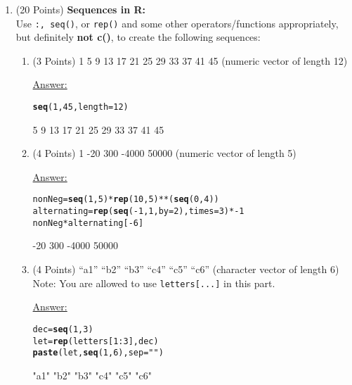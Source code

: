 \documentclass[12pt,letterpaper,final]{article}\usepackage[]{graphicx}\usepackage[]{xcolor}
\makeatletter
\newcommand{\hlnum}[1]{\textcolor[rgb]{0.686,0.059,0.569}{#1}}%
\newcommand{\hlstr}[1]{\textcolor[rgb]{0.192,0.494,0.8}{#1}}%
\newcommand{\hlopt}[1]{\textcolor[rgb]{0,0,0}{#1}}%
\newcommand{\hlstd}[1]{\textcolor[rgb]{0.345,0.345,0.345}{#1}}%
\newcommand{\hlkwb}[1]{\textcolor[rgb]{0.69,0.353,0.396}{#1}}%
\newcommand{\hlkwc}[1]{\textcolor[rgb]{0.333,0.667,0.333}{#1}}%
\newcommand{\hlkwd}[1]{\textcolor[rgb]{0.737,0.353,0.396}{\textbf{#1}}}%
\newenvironment{kframe}{%
 \def\at@end@of@kframe{}%
 \ifinner\ifhmode%
  \def\at@end@of@kframe{\end{minipage}}%
  \begin{minipage}{\columnwidth}%
 \fi\fi%
 \def\FrameCommand##1{\hskip\@totalleftmargin \hskip-\fboxsep
 \colorbox{shadecolor}{##1}\hskip-\fboxsep
     \hskip-\linewidth \hskip-\@totalleftmargin \hskip\columnwidth}%
 \MakeFramed {\advance\hsize-\width
   \@totalleftmargin\z@ \linewidth\hsize
   \@setminipage}}%
 {\par\unskip\endMakeFramed%
 \at@end@of@kframe}
\makeatother
\begin{document}
\begin{enumerate}

\item (20 Points) {\bf Sequences in R:} \\
Use {\tt :, seq()}, or {\tt rep()} and some other operators/functions appropriately, 
but definitely {\bf not c()}, to create the following sequences:

\begin{enumerate}
\item (3 Points)
1  5  9 13 17 21 25 29 33 37 41 45 (numeric vector of length 12)

\underline{Answer:}
\begin{kframe}
\begin{alltt}
\hlkwd{seq}\hlstd{(}\hlnum{1}\hlstd{,}\hlnum{45}\hlstd{,}\hlkwc{length}\hlstd{=}\hlnum{12}\hlstd{)}
\end{alltt}
\end{kframe} [1]  1  5  9 13 17 21 25 29 33 37 41 45



\item (4 Points)
1   -20   300 -4000 50000 (numeric vector of length 5)

\underline{Answer:}
\begin{kframe}
\begin{alltt}
\hlstd{nonNeg} \hlkwb{=} \hlkwd{seq}\hlstd{(}\hlnum{1}\hlstd{,}\hlnum{5}\hlstd{)}\hlopt{*}\hlkwd{rep}\hlstd{(}\hlnum{10}\hlstd{,}\hlnum{5}\hlstd{)}\hlopt{**}\hlstd{(}\hlkwd{seq}\hlstd{(}\hlnum{0}\hlstd{,}\hlnum{4}\hlstd{))}
\hlstd{alternating}\hlkwb{=}\hlkwd{rep}\hlstd{(}\hlkwd{seq}\hlstd{(}\hlopt{-}\hlnum{1}\hlstd{,}\hlnum{1}\hlstd{,}\hlkwc{by}\hlstd{=}\hlnum{2}\hlstd{),} \hlkwc{times}\hlstd{=}\hlnum{3}\hlstd{)}\hlopt{*-}\hlnum{1}
\hlstd{nonNeg}\hlopt{*}\hlstd{alternating[}\hlopt{-}\hlnum{6}\hlstd{]}
\end{alltt}
\end{kframe}[1]     1   -20   300 -4000 50000



\item (4 Points)
``a1'' ``b2'' ``b3'' ``c4'' ``c5'' ``c6'' (character vector of length 6) \\
Note: You are allowed to use \verb|letters[...]| in this part.

\underline{Answer:}
\begin{kframe}
\begin{alltt}
\hlstd{dec}\hlkwb{=}\hlkwd{seq}\hlstd{(}\hlnum{1}\hlstd{,}\hlnum{3}\hlstd{)}
\hlstd{let} \hlkwb{=} \hlkwd{rep}\hlstd{(letters[}\hlnum{1}\hlopt{:}\hlnum{3}\hlstd{], dec)}
\hlkwd{paste}\hlstd{(let,} \hlkwd{seq}\hlstd{(}\hlnum{1}\hlstd{,}\hlnum{6}\hlstd{),} \hlkwc{sep}\hlstd{=}\hlstr{""}\hlstd{)}
\end{alltt}
\end{kframe}[1] "a1" "b2" "b3" "c4" "c5" "c6"




\end{enumerate}
\end{enumerate}
\end{document}
